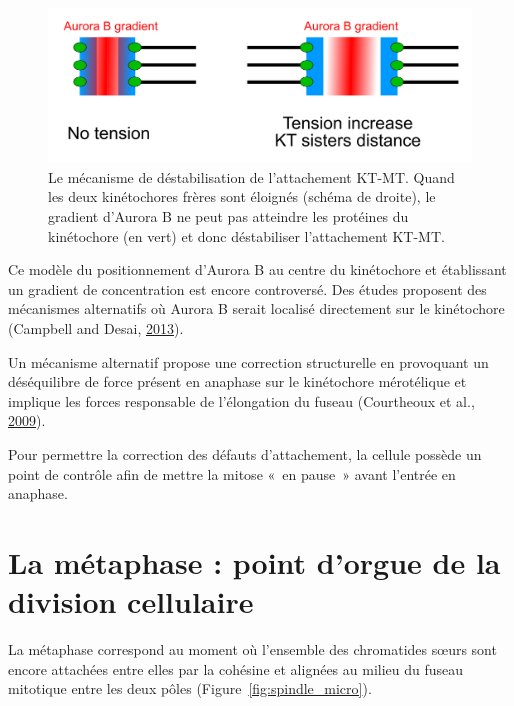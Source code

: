 \documentclass[12pt,a4paper,twoside,openright]{book}
\begin{document}
\begin{figure}[htbp]
\centering
\includegraphics{figures/intro/aurora.png}
\caption[Le mécanisme de déstabilisation de l'attachement KT-MT]{\label{fig:aurora}Le
mécanisme de déstabilisation de l'attachement KT-MT. Quand les deux
kinétochores frères sont éloignés (schéma de droite), le gradient
d'Aurora B ne peut pas atteindre les protéines du kinétochore (en vert)
et donc déstabiliser l'attachement KT-MT.}
\end{figure}

Ce modèle du positionnement d'Aurora B au centre du kinétochore et
établissant un gradient de concentration est encore controversé. Des
études proposent des mécanismes alternatifs où Aurora B serait localisé
directement sur le kinétochore (Campbell and Desai,
\protect\hyperlink{ref-Campbell2013a}{2013}).

Un mécanisme alternatif propose une correction structurelle en
provoquant un déséquilibre de force présent en anaphase sur le
kinétochore mérotélique et implique les forces responsable de
l'élongation du fuseau (Courtheoux et al.,
\protect\hyperlink{ref-Courtheoux2009}{2009}).

Pour permettre la correction des défauts d'attachement, la cellule
possède un point de contrôle afin de mettre la mitose «~en pause~» avant
l'entrée en anaphase.

\section{La métaphase : point d'orgue de la division
cellulaire}\label{la-muxe9taphase-point-dorgue-de-la-division-cellulaire}

La métaphase correspond au moment où l'ensemble des chromatides sœurs
sont encore attachées entre elles par la cohésine et alignées au milieu
du fuseau mitotique entre les deux pôles
(Figure~\ref{fig:spindle_micro}).
\end{document}
